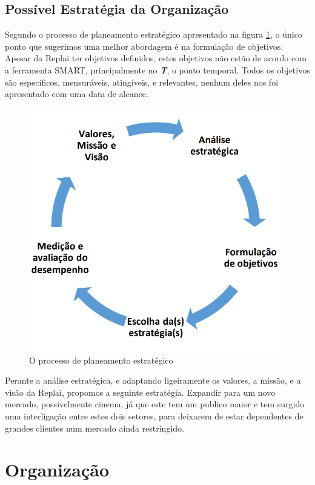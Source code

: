 \newpage
\subsection{Possível Estratégia da Organização}
Segundo o processo de planeamento estratégico apresentado na figura \ref{fig:planeamento}, o único ponto que sugerimos uma melhor abordagem é na formulação de objetivos. Apesar da Replai ter objetivos definidos, estes objetivos não estão de acordo com a ferramenta SMART, principalmente no \textit{\textbf{T}}, o ponto temporal. Todos os objetivos são específicos, mensuráveis, atingíveis, e relevantes, nenhum deles nos foi apresentado com uma data de alcance.

\begin{figure}[ht]
    \centering
    \includegraphics[scale=0.5]{images/planeamento.png}
    \caption{O processo de planeamento estratégico}
    \label{fig:planeamento}
\end{figure}


Perante a análise estratégica, e adaptando ligeiramente os valores, a missão, e a visão da Replai, propomos a seguinte estratégia. Expandir para um novo mercado, possivelmente cinema, já que este tem um publico maior e tem surgido uma interligação entre estes dois setores, para deixarem de estar dependentes de grandes clientes num mercado ainda restringido.

\newpage    
\section{Organização}
